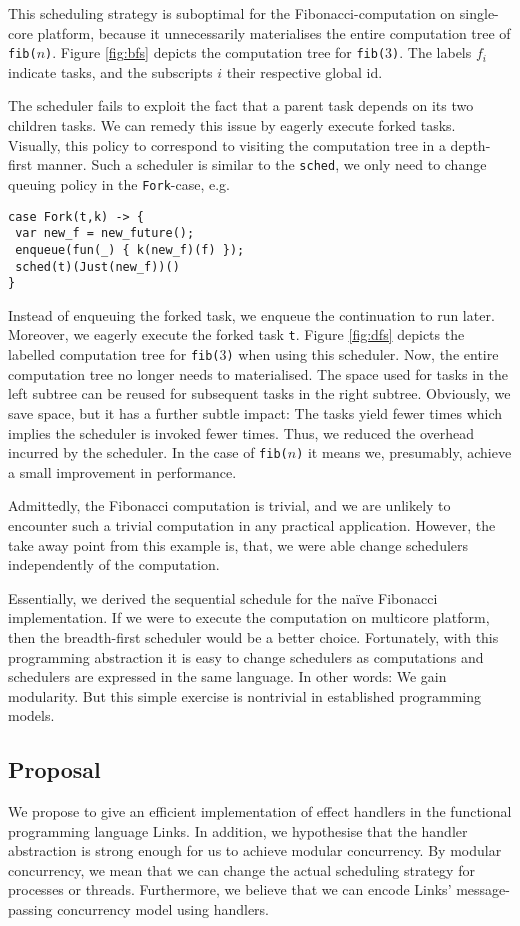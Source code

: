\documentclass[preprint,10pt,numbers]{sigplanconf}
\begin{document}
This scheduling strategy is suboptimal for the Fibonacci-computation on single-core platform, because it unnecessarily materialises the entire computation tree of \texttt{fib($n$)}. Figure \ref{fig:bfs} depicts the computation tree for \texttt{fib($3$)}. The labels $f_i$ indicate tasks, and the subscripts $i$ their respective global id.

The scheduler fails to exploit the fact that a parent task depends on its two children tasks. We can remedy this issue by eagerly execute forked tasks. Visually, this policy to correspond to visiting the computation tree in a depth-first manner. Such a scheduler is similar to the \texttt{sched}, we only need to change queuing policy in the \texttt{Fork}-case, e.g.
\begin{lstlisting}[style={links},caption={}]
case Fork(t,k) -> {
 var new_f = new_future();
 enqueue(fun(_) { k(new_f)(f) });
 sched(t)(Just(new_f))()
}
\end{lstlisting}
Instead of enqueuing the forked task, we enqueue the continuation to run later. Moreover, we eagerly execute the forked task \texttt{t}.
Figure \ref{fig:dfs} depicts the labelled computation tree for \texttt{fib($3$)} when using this scheduler. Now, the entire computation tree no longer needs to materialised. The space used for tasks in the left subtree can be reused for subsequent tasks in the right subtree. Obviously, we save space, but it has a further subtle impact: The tasks yield fewer times which implies the scheduler is invoked fewer times. Thus, we reduced the overhead incurred by the scheduler. In the case of \texttt{fib($n$)} it means we, presumably, achieve a small improvement in performance.

Admittedly, the Fibonacci computation is trivial, and we are unlikely to encounter such a trivial computation in any practical application. However, the take away point from this example is, that, we were able change schedulers independently of the computation.

Essentially, we derived the sequential schedule for the naïve Fibonacci implementation. If we were to execute the computation on multicore platform, then the breadth-first scheduler would be a better choice. Fortunately, with this programming abstraction it is easy to change schedulers as computations and schedulers are expressed in the same language. In other words: We gain modularity. But this simple exercise is nontrivial in established programming models.

\subsection{Proposal}
We propose to give an efficient implementation of effect handlers in the functional programming language Links. In addition, we hypothesise that the handler abstraction is strong enough for us to achieve modular concurrency. By modular concurrency, we mean that we can change the actual scheduling strategy for processes or threads. Furthermore, we believe that we can encode Links' message-passing concurrency model using handlers. 
\end{document}
